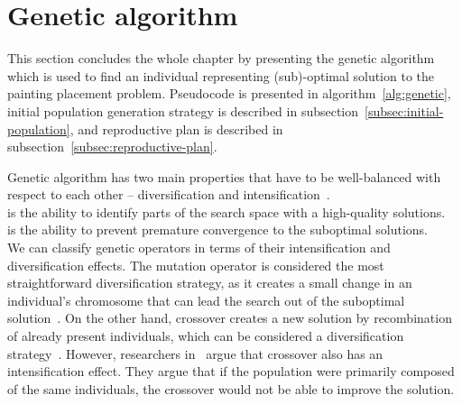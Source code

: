 \clearpage%
\newpage


\section{Genetic algorithm}\label{sec:genetic-algorithm}
This section concludes the whole chapter by presenting the genetic algorithm
which is used to find an individual representing (sub)-optimal solution to the painting placement problem.
Pseudocode is presented in algorithm~\ref{alg:genetic}, initial population generation strategy is described in
subsection~\ref{subsec:initial-population}, and reproductive plan is described in subsection~\ref{subsec:reproductive-plan}.

Genetic algorithm has two main properties that have to be well-balanced with respect to each other
– diversification and intensification~\cite{blumMetaheuristicsCombinatorialOptimization2003}.\\

 is the ability to identify parts of the search space with a high-quality
solutions.\\

 is the ability to prevent premature convergence to the suboptimal solutions.\\

We can classify genetic operators in terms of their intensification and diversification effects.
The mutation operator is considered the most straightforward diversification strategy,
as it creates a small change in an individual's chromosome that can lead the search out of the suboptimal solution~\cite{blumMetaheuristicsCombinatorialOptimization2003}.
On the other hand, crossover creates a new solution by recombination of already present
individuals, which can be considered a diversification strategy~\cite{blumMetaheuristicsCombinatorialOptimization2003}.
However, researchers in~\cite{hanshengBalanceExplorationExploitation1999} argue that crossover
also has an intensification effect.
They argue that if the population were primarily composed of the same individuals, the crossover would not be able to improve the solution.
\\

